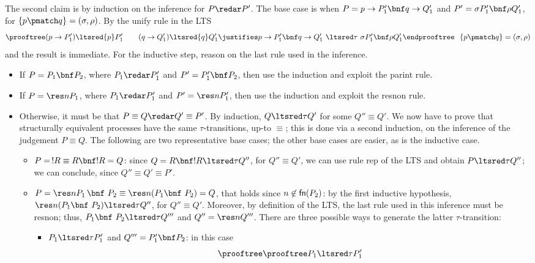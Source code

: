 \documentclass{LMCS}
\begin{document}
\medskip\noindent
The second claim is by induction on the inference for $P \redar P'$.
The base case is when $P = p\to P'_1\bnf q\to Q'_1$ and $P' =\sigma P'_1\bnf\rho Q'_1$,
for $\{p\pmatch q\}=(\sigma,\rho)$. By the {\sf unify} rule in the LTS
        \begin{equation*}
        \prooftree (p\to P'_1) \ltsred{p}P'_1 \qquad (q\to Q'_1) \ltsred{q}Q'_1
        \justifies p\to P'_1\bnf q\to Q'_1\ \ltsred\tau\ \sigma P'_1\bnf\rho Q'_1
        \endprooftree\ \ \{p\pmatch q\}=(\sigma,\rho)
        \end{equation*}
and the result is immediate.
For the inductive step, reason on the last rule used in the inference.
\begin{itemize}
	\item If $P=P_1\bnf P_2$, where $P_1\redar P'_1$ and $P' = P_1'\bnf P_2$,
		then use the induction and exploit the {\sf parint} rule.
	\item If $P=\res n P_1$, where $P_1\redar P'_1$ and $P' = \res n P'_1$,
		then use the induction and exploit the {\sf resnon} rule.
	\item Otherwise, it must be that $P \equiv Q \redar Q' \equiv P'$. 
		By induction, $Q \ltsred\tau Q'$ for some $Q'' \equiv Q'$.
		We now have to prove that structurally equivalent processes have
		the same $\tau$-transitions, up-to $\equiv$; this is done via
		a second induction, on the inference of the judgement $P \equiv Q$.
		The following are two representative base cases; the other base cases are easier,
		as is the inductive case.
		\begin{itemize}
		\item $P =\, !R \equiv R\bnf!R = Q$: since $Q = R\bnf!R \ltsred\tau Q''$, for $Q'' \equiv Q'$,
			we can use rule {\sf rep} of the LTS and obtain $P \ltsred\tau Q''$; 
			we can conclude, since $Q'' \equiv Q' \equiv P'$.
		\item $P = \res n P_1\, \bnf\ P_2 \equiv \res n (P_1 \bnf\ P_2) = Q$, that holds since
			$n \not\in {\sf fn}(P_2)$: by the first inductive hypothesis, 
			$\res n (P_1 \bnf\ P_2) \ltsred\tau Q''$, for $Q'' \equiv Q'$. Moreover, by definition
			of the LTS, the last rule used in this inference must be {\sf resnon}; thus, 
			$P_1 \bnf\ P_2 \ltsred\tau Q'''$ and $Q'' = \res n Q'''$. There are three possible
			ways to generate the latter $\tau$-transition:
			\begin{itemize}
			\item $P_1 \ltsred\tau P_1'$ and $Q''' = P_1'\bnf P_2$: in this case
			$$
			\prooftree 
				\prooftree P_1 \ltsred\tau P_1'
$$
\end{itemize}
\end{itemize}
\end{itemize}
\end{document}

